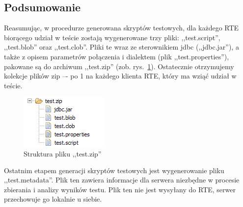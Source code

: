\subsection{Podsumowanie}
Reasumując, w procedurze generowana skryptów testowych, dla każdego RTE biorącego 
udział w teście zostają wygenerowane trzy pliki: ,,test.script'', ,,test.blob'' oraz ,,test.clob''.
Pliki te wraz ze sterownikiem jdbc (,,jdbc.jar''), a także z opisem parametrów połączenia i dialektem (plik ,,test.properties''), 
pakowane są do archiwum ,,test.zip'' (zob. rys.~\ref{rys:testzip}). Ostatecznie otrzymujemy kolekcje plików zip 
–- po 1 na każdego klienta RTE, który ma wziąć udział w teście.
\begin{figure}[h]
\begin{center}
\includegraphics[width=0.4\linewidth]{figures/testzip.png}
\end{center}
\caption{Struktura pliku ,,test.zip''}\label{rys:testzip}
\end{figure}
Ostatnim etapem generacji skryptów testowych jest wygenerowanie pliku ,,test.metadata''. 
Plik ten zawiera informacje dla serwera niezbędne w procesie zbierania i analizy wyników testu.
Plik ten nie jest wysyłany do RTE, serwer przechowuje go lokalnie u siebie. 



